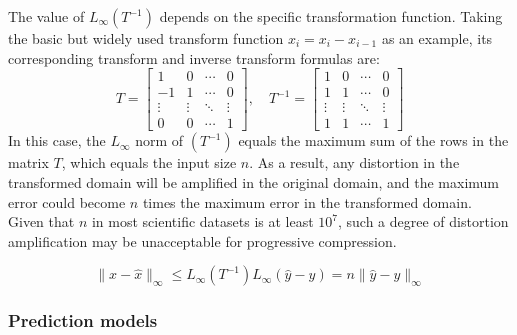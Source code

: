 The value of $L_\infty(T^{-1})$ depends on the specific transformation function. Taking the basic but widely used transform function $x_i=x_i-x_{i-1}$ as an example, its corresponding transform and inverse transform formulas are:
\[
T = 
\begin{bmatrix}
1 & 0  & \cdots & 0 \\
-1 & 1 & \cdots & 0 \\
\vdots   & \vdots & \ddots & \vdots \\
0 & 0 & \cdots & 1
\end{bmatrix}, \quad
T^{-1} = 
\begin{bmatrix}
1 & 0   & \cdots & 0 \\
1 & 1   & \cdots & 0 \\
\vdots   & \vdots & \ddots & \vdots \\
1 & 1  & \cdots & 1
\end{bmatrix}
\]
In this case, the $L_\infty$ norm of $(T^{-1})$ equals the maximum sum of the rows in the matrix $T$, which equals the input size $n$.  As a result, any distortion in the transformed domain will be amplified in the original domain, and the maximum error could become $n$ times the maximum error in the transformed domain.  Given that $n$ in most scientific datasets is at least $10^7$, such a degree of distortion amplification may be unacceptable for progressive compression.

\begin{equation}
\|x - \hat x\|_\infty \leq  L_\infty(T^{-1})L_\infty(\hat{y} - y) = n \|\hat{y} - y\|_\infty
\label{eq:error-transform-lorenzo}
\end{equation}





\subsubsection{Prediction models}




